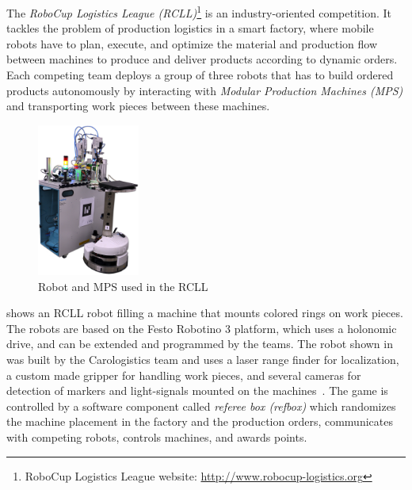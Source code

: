 The \emph{RoboCup Logistics League (RCLL)}\footnote{RoboCup Logistics
  League website: \url{http://www.robocup-logistics.org}}
is an industry-oriented competition.  It tackles
the problem of production logistics in a smart factory, where mobile
robots have to plan, execute, and optimize the material and production
flow between machines to produce and deliver products according to
dynamic orders. Each competing team deploys a group of three robots
that has to build ordered products autonomously by interacting with
\emph{Modular Production Machines (MPS)} and transporting work pieces
between these machines.
\begin{figure}
  \centering
  \vspace{-2.7ex}
  \includegraphics[width=0.3\textwidth]{img/rcll}
  \vspace{-4ex}
  \caption{Robot and MPS used in the RCLL~\cite{chapter-cps}}
  \label{fig:rcll}
\end{figure}
 shows an RCLL robot filling
a machine that mounts colored rings on work pieces. The robots are
based on the Festo Robotino 3 platform, which uses a holonomic drive,
and can be extended and programmed by the teams. The robot shown in
 was built by the Carologistics team and uses a
laser range finder for localization, a custom made gripper for
handling work pieces, and several cameras for detection of markers and
light-signals mounted on the machines~\cite{Carologistics2015,chapter-cps}. The
game is controlled by a software component called \emph{referee box
  (refbox)} which randomizes the machine placement in the factory and
the production orders, communicates with competing robots,
controls machines, and awards points.

